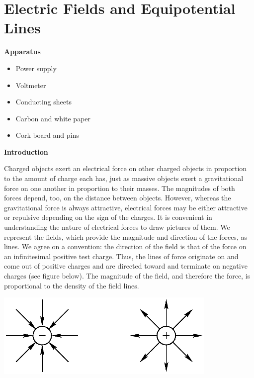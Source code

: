 
\section{Electric Fields and Equipotential Lines}

\makelabheader %


\bigskip
\textbf{Apparatus}
\begin{itemize}[nosep]
\item Power supply
\item Voltmeter
\item Conducting sheets
\item Carbon and white paper
\item Cork board and pins
\end{itemize}

\medskip

\textbf{Introduction}

Charged objects exert an electrical force on other charged objects
in proportion to the amount of charge each has, just as massive objects
exert a gravitational force on one another in proportion to their
masses. The magnitudes of both forces depend, too, on the distance
between objects. However, whereas the gravitational force is always
attractive, electrical forces may be either attractive or repulsive
depending on the sign of the charges. It is convenient in understanding
the nature of electrical forces to draw pictures of them. We represent
the fields, which provide the magnitude and direction of the forces,
as lines. We agree on a convention: the direction of the field is
that of the force on an infinitesimal positive test charge. Thus,
the lines of force originate on and come out of positive charges and
are directed toward and terminate on negative charges (see figure
below). The magnitude of the field, and therefore the force, is proportional
to the density of the field lines.

{\centering \includegraphics[height=1.6in]{electric_fields_and_equipotential_lines/ef_equipot_lines_fig_1.eps} \par}

